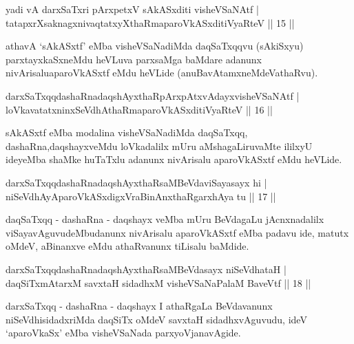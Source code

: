 
\begin{shl}
yadi vA darxSaTxri pArxpetxV sAkASxditi visheVSaNAtf |\\
tatapxrXsaknagxnivaqtatxyXthaRmaparoVkASxditiVyaRteV \hfill || 15 ||
\end{shl}

\begin{artha}
athavA `sAkASxtf' eMba visheVSaNadiMda daqSaTxqqvu (sAkiSxyu) parxtayxkaSxneMdu heVLuva parxsaMga baMdare adanunx nivArisalu\break aparoVkASxtf eMdu heVLide (anuBavAtamxneMdeVathaRvu).
\end{artha}


\begin{shl}
darxSaTxqqdashaRnadaqshAyxthaRpArxpAtxvAdayxvisheVSaNAtf |\\
loVkavatatxninxSeVdhAthaRmaparoVkASxditiVyaRteV \hfill || 16 ||
\end{shl}

\begin{artha}
sAkASxtf eMba modalina visheVSaNadiMda daqSaTxqq, dashaRna,\break daqshayxveMdu loVkadalilx mUru aMshagaLiruvaMte ililxyU ideyeMba shaMke huTaTxlu adanunx nivArisalu aparoVkASxtf eMdu heVLide.
\end{artha}

\begin{shl}
darxSaTxqqdashaRnadaqshAyxthaRsaMBeVdaviSayasayx hi |\\
niSeVdhAyAparoVkASxdigxVraBinAnxthaRgarxhAya tu \hfill || 17 ||
\end{shl}

\begin{artha}
daqSaTxqq - dashaRna - daqshayx veMba mUru BeVdagaLu jAcnxnadalilx  viSayavAguvudeMbudanunx nivArisalu aparoVkASxtf eMba padavu ide, matutx oMdeV, aBinanxve eMdu athaRvanunx tiLisalu baMdide.
\end{artha}


\begin{shl}
darxSaTxqqdashaRnadaqshAyxthaRsaMBeVdasayx niSeVdhataH |\\
daqSiTxmAtarxM savxtaH sidadhxM visheVSaNaPalaM BaveVtf \hfill || 18 ||
\end{shl}

\begin{artha}
darxSaTxqq - dashaRna - daqshayx I athaRgaLa BeVdavanunx niSeVdhisidadxriMda daqSiTx oMdeV savxtaH sidadhxvAguvudu, ideV `aparoVkaSx' eMba visheVSaNada parxyoVjanavAgide.
\end{artha}


